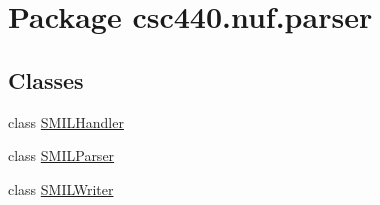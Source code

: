\hypertarget{namespacecsc440_1_1nuf_1_1parser}{\section{Package csc440.\-nuf.\-parser}
\label{namespacecsc440_1_1nuf_1_1parser}
}
\subsection*{Classes}
\begin{DoxyCompactItemize}
\item 
class \hyperlink{classcsc440_1_1nuf_1_1parser_1_1_s_m_i_l_handler}{S\-M\-I\-L\-Handler}
\item 
class \hyperlink{classcsc440_1_1nuf_1_1parser_1_1_s_m_i_l_parser}{S\-M\-I\-L\-Parser}
\item 
class \hyperlink{classcsc440_1_1nuf_1_1parser_1_1_s_m_i_l_writer}{S\-M\-I\-L\-Writer}
\end{DoxyCompactItemize}
